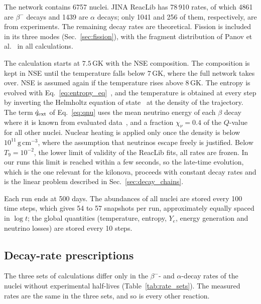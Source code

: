 The network contains 6757 nuclei.
JINA ReacLib has 78\,910 rates, of which 4861 are $\beta^-$ decays and 1439 are $\alpha$ decays; only 1041 and 256 of them, respectively, are from experiments.
The remaining decay rates are theoretical.
Fission is included in its three modes (Sec.~\ref{sec:fission}), with the fragment distribution of Panov et al.~\cite{panov_could_2001} in all calculations.

The calculation starts at $7.5\,\mathrm{GK}$ with the NSE composition.
The composition is kept in NSE until the temperature falls below $7\,\mathrm{GK}$, where the full network takes over.
NSE is assumed again if the temperature rises above $8\,\mathrm{GK}$.
The entropy is evolved with Eq.~\ref{eq:entropy_eq}~\cite{freiburghaus_r-process_1999}, and the temperature is obtained at every step by inverting the Helmholtz equation of state~\cite{timmes_accuracy_2000} at the density of the trajectory.
The term $\dot q_{\rm ext}$ of Eq.~\ref{eq:qnu} uses the mean neutrino energy of each $\beta$ decay where it is known from evaluated data~\cite{brown_endfb-viii0_2018}, and a fraction $\chi_\nu=0.4$ of the $Q$-value for all other nuclei.
Nuclear heating is applied only once the density is below $10^{11}\,\mathrm{g\,cm^{-3}}$, where the assumption that neutrinos escape freely is justified.
Below $T_9=10^{-2}$, the lower limit of validity of the ReacLib fits, all rates are frozen.
In our runs this limit is reached within a few seconds, so the late-time evolution, which is the one relevant for the kilonova, proceeds with constant decay rates and is the linear problem described in Sec.~\ref{sec:decay_chains}.

Each run ends at 500 days.
The abundances of all nuclei are stored every 100 time steps, which gives 54 to 57 snapshots per run, approximately equally spaced in $\log t$; the global quantities (temperature, entropy, $Y_e$, energy generation and neutrino losses) are stored every 10 steps.

\subsection{Decay-rate prescriptions}\label{sec:methods_rates}

The three sets of calculations differ only in the $\beta^-$- and $\alpha$-decay rates of the nuclei without experimental half-lives (Table~\ref{tab:rate_sets}).
The measured rates are the same in the three sets, and so is every other reaction.

